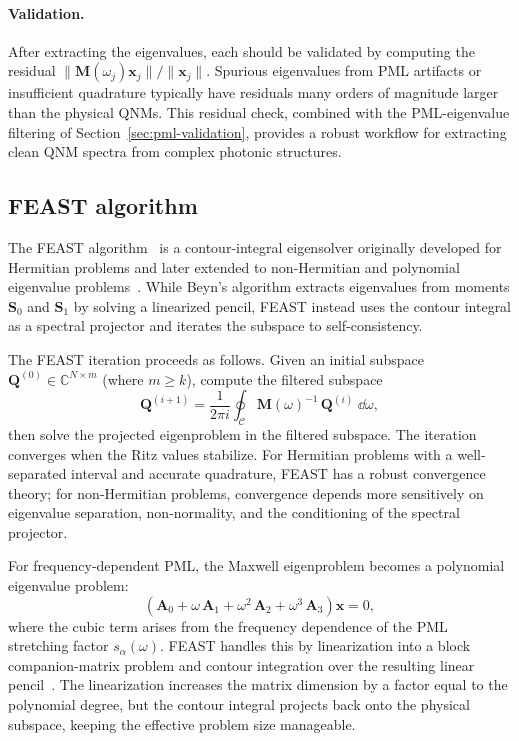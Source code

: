 \paragraph{Validation.}
After extracting the eigenvalues, each should be validated by computing
the residual $\|\mathbf{M}(\omega_j)\mathbf{x}_j\|/\|\mathbf{x}_j\|$.
Spurious eigenvalues from PML artifacts or insufficient quadrature
typically have residuals many orders of magnitude larger than the
physical QNMs. This residual check, combined with the PML-eigenvalue
filtering of Section~\ref{sec:pml-validation}, provides a robust
workflow for extracting clean QNM spectra from complex photonic
structures.

\subsection{FEAST algorithm}
\label{ssec:feast}

The FEAST algorithm~\cite{wu2026rigorous,opg2023dispersive} is a
contour-integral eigensolver originally developed for Hermitian
problems and later extended to non-Hermitian and polynomial eigenvalue
problems~\cite{jgopalakrishnan2022computing}. While Beyn's algorithm
extracts eigenvalues from moments $\mathbf{S}_0$ and $\mathbf{S}_1$
by solving a linearized pencil, FEAST instead uses the contour
integral as a spectral projector and iterates the subspace to
self-consistency.

The FEAST iteration proceeds as follows. Given an initial subspace
$\mathbf{Q}^{(0)} \in \mathbb{C}^{N \times m}$ (where $m \ge k$),
compute the filtered subspace
\begin{equation}
 \mathbf{Q}^{(i+1)} = \frac{1}{2\pi i}\oint_{\mathcal{C}}
 \mathbf{M}(\omega)^{-1}\,\mathbf{Q}^{(i)}\;\dd\omega,
 \label{eq:feast-iteration}
\end{equation}
then solve the projected eigenproblem in the filtered subspace. The
iteration converges when the Ritz values stabilize. For Hermitian
problems with a well-separated interval and accurate quadrature, FEAST
has a robust convergence theory; for non-Hermitian problems, convergence
depends more sensitively on eigenvalue separation, non-normality, and
the conditioning of the spectral projector.

For frequency-dependent PML, the Maxwell eigenproblem becomes a
polynomial eigenvalue problem:
\begin{equation}
 \left(\mathbf{A}_0 + \omega\,\mathbf{A}_1
 + \omega^2\,\mathbf{A}_2
 + \omega^3\,\mathbf{A}_3\right)\mathbf{x} = 0,
 \label{eq:polynomial-evp}
\end{equation}
where the cubic term arises from the frequency dependence of the PML
stretching factor $s_\alpha(\omega)$. FEAST handles this by
linearization into a block companion-matrix problem and contour
integration over the resulting linear
pencil~\cite{jgopalakrishnan2022computing}. The linearization
increases the matrix dimension by a factor equal to the polynomial
degree, but the contour integral projects back onto the physical
subspace, keeping the effective problem size manageable.

